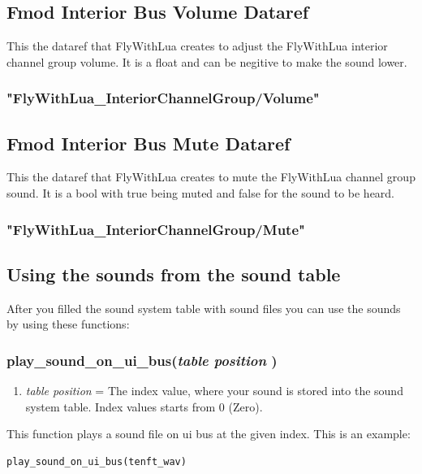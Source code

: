 \documentclass[11pt,parskip=half,a4paper]{scrartcl}
\begin{document}
\subsection{Fmod Interior Bus Volume Dataref}
This the dataref that FlyWithLua creates to adjust the FlyWithLua interior channel group volume. It is a float and can be negitive to make the sound lower.

\subsubsection{"FlyWithLua\_InteriorChannelGroup/Volume"}

\subsection{Fmod Interior Bus Mute Dataref}
This the dataref that FlyWithLua creates to mute the FlyWithLua channel group sound. It is a bool with true being muted and false for the sound to be heard.

\subsubsection{"FlyWithLua\_InteriorChannelGroup/Mute"}


\newpage
\subsection{Using the sounds from the sound table}

After you filled the sound system table with sound files you can use the sounds by using these functions:

\subsubsection{ play\_sound\_on\_ui\_bus(\emph{table position} )}

\begin{enumerate}
	\item \emph{table position} = The index value, where your sound is stored into the sound system table. Index values starts from 0 (Zero).
\end{enumerate}

This function plays a sound file on ui bus at the given index. This is an example:


\begin{lstlisting}
play_sound_on_ui_bus(tenft_wav)
\end{lstlisting}
\end{document}
